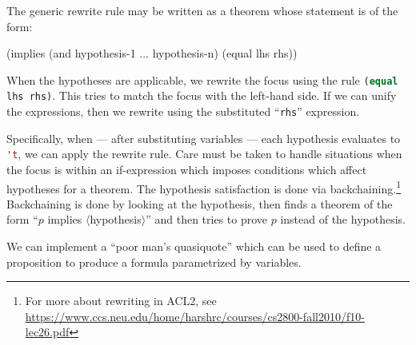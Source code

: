 
The generic rewrite rule may be written as a theorem whose statement is
of the form:
\begin{lisp-example}[caption={Template of theorem statement}]
(implies (and hypothesis-1 ... hypothesis-n)
         (equal lhs rhs))
\end{lisp-example}
When the hypotheses are applicable, we rewrite the focus using the rule 
\lstinline[language=lisp]{(equal lhs rhs)}.
This tries to match the focus with the left-hand side. If we can unify
the expressions, then we rewrite using the substituted ``\lstinline[language=lisp]{rhs}''
expression.

Specifically, when --- after substituting variables --- each hypothesis
evaluates to \lstinline[language=lisp]{'t}, we can apply the rewrite rule.
Care must be taken to handle situations when the focus is within an
if-expression which imposes conditions which affect hypotheses for a
theorem. The hypothesis satisfaction is done via backchaining.\footnote{For more about rewriting in ACL2, see \url{https://www.ccs.neu.edu/home/harshrc/courses/cs2800-fall2010/f10-lec26.pdf}}
Backchaining is done by looking at the hypothesis, then finds a theorem
of the form ``$p$ implies $\langle$hypothesis$\rangle$'' and then tries
to prove $p$ instead of the hypothesis.

\M We can implement a ``poor man's quasiquote'' which can be used to
define a proposition to produce a formula parametrized by variables.

